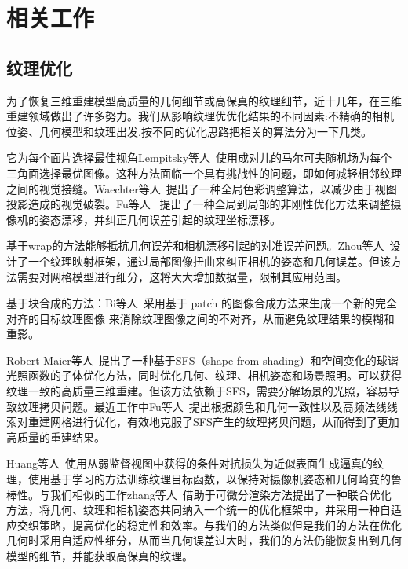 \section{相关工作}
\subsection{纹理优化}
为了恢复三维重建模型高质量的几何细节或高保真的纹理细节，近十几年，在三维重建领域做出了许多努力。我们从影响纹理优优化结果的不同因素:不精确的相机位姿、几何模型和纹理出发,按不同的优化思路把相关的算法分为一下几类。\par
\vspace*{2mm}它为每个面片选择最佳视角Lempitsky等人~\cite{lempitsky2007seamless}使用成对儿的马尔可夫随机场为每个三角面选择最优图像。这种方法面临一个具有挑战性的问题，即如何减轻相邻纹理之间的视觉接缝。Waechter等人~\cite{waechter2014let}提出了一种全局色彩调整算法，以减少由于视图投影造成的视觉破裂。Fu等人~\cite{fu2018texture} 提出了一种全局到局部的非刚性优化方法来调整摄像机的姿态漂移，并纠正几何误差引起的纹理坐标漂移。\par
\vspace*{2mm}基于wrap的方法能够抵抗几何误差和相机漂移引起的对准误差问题。Zhou等人~\cite{zhou2014color}设计了一个纹理映射框架，通过局部图像扭曲来纠正相机的姿态和几何误差。但该方法需要对网格模型进行细分，这将大大增加数据量，限制其应用范围。\par
基于块合成的方法：Bi等人~\cite{bi2017patch}采用基于 patch 的图像合成方法来生成一个新的完全对齐的目标纹理图像 来消除纹理图像之间的不对齐，从而避免纹理结果的模糊和重影。\par
\vspace*{2mm}Robert Maier等人~\cite{RobertMaier2017Intrinsic3DH3}提出了一种基于SFS（shape-from-shading）和空间变化的球谐光照函数的子体优化方法，同时优化几何、纹理、相机姿态和场景照明。可以获得纹理一致的高质量三维重建。但该方法依赖于SFS，需要分解场景的光照，容易导致纹理拷贝问题。最近工作中Fu等人~\cite{YanpingFu2020JointTA}提出根据颜色和几何一致性以及高频法线线索对重建网格进行优化，有效地克服了SFS产生的纹理拷贝问题，从而得到了更加高质量的重建结果。\par
\vspace*{2mm}Huang等人~\cite{JingweiHuang2020AdversarialTO}使用从弱监督视图中获得的条件对抗损失为近似表面生成逼真的纹理，使用基于学习的方法训练纹理目标函数，以保持对摄像机姿态和几何畸变的鲁棒性。与我们相似的工作zhang等人~\cite{9705143}借助于可微分渲染方法提出了一种联合优化方法，将几何、纹理和相机姿态共同纳入一个统一的优化框架中，并采用一种自适应交织策略，提高优化的稳定性和效率。与我们的方法类似但是我们的方法在优化几何时采用自适应性细分，从而当几何误差过大时，我们的方法仍能恢复出到几何模型的细节，并能获取高保真的纹理。

